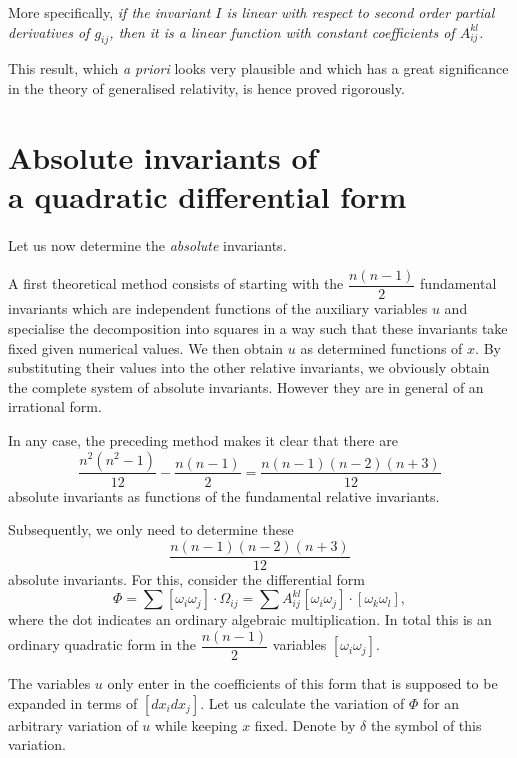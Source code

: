 \documentclass[leqno,12pt]{article}
\theoremstyle{shape1}
\theoremstyle{shape0}
\theoremstyle{shape2}
\theoremstyle{definition}
\begin{document}
More specifically, \emph{if the invariant $I$ is linear with respect to second order partial derivatives of $g_{ij}$, then it is a linear function with constant coefficients of $A^{kl}_{ij}$.}

This result, which \emph{a priori} looks very plausible and which has a great significance in the theory of generalised relativity, is hence proved rigorously.


\section[{Absolute invariants of a quadratic differential form}]{Absolute invariants of\\a quadratic differential form}
\label{sec:absol-invar-quadr}

\paragraph{}
\label{sec:24}
Let us now determine the \emph{absolute} invariants.

A first theoretical method consists of starting with the $\dfrac{n(n-1)}{2}$ fundamental invariants which are independent functions of the auxiliary variables $u$ and specialise the decomposition into squares in a way such that these invariants take fixed given numerical values. We then obtain $u$ as determined functions of $x$. By substituting their values into the other relative invariants, we obviously obtain the complete system of absolute invariants. However they are in general of an irrational form.

In any case, the preceding method makes it clear that there are
\[
\frac{n^{2}(n^{2}-1)}{12}-\frac{n(n-1)}{2}=\frac{n(n-1)(n-2)(n+3)}{12}
\]
absolute invariants as functions of the fundamental relative invariants.

Subsequently, we only need to determine these
\[
\frac{n(n-1)(n-2)(n+3)}{12}
\]
absolute invariants. For this, consider the differential form
\[
\Phi=\sum[\omega_{i}\omega_{j}]\cdot\Omega_{ij}=\sum A^{kl}_{ij}[\omega_{i}\omega_{j}]\cdot[\omega_{k}\omega_{l}],
\]
where the dot indicates an ordinary algebraic multiplication. In total this is an ordinary quadratic form in the $\dfrac{n(n-1)}{2}$ variables $[\omega_{i}\omega_{j}]$.

The variables $u$ only enter in the coefficients of this form that is supposed to be expanded in terms of $[dx_{i}dx_{j}]$. Let us calculate the variation of $\Phi$ for an arbitrary variation of $u$ while keeping $x$ fixed. Denote by $\delta$ the symbol of this variation.
\end{document}

